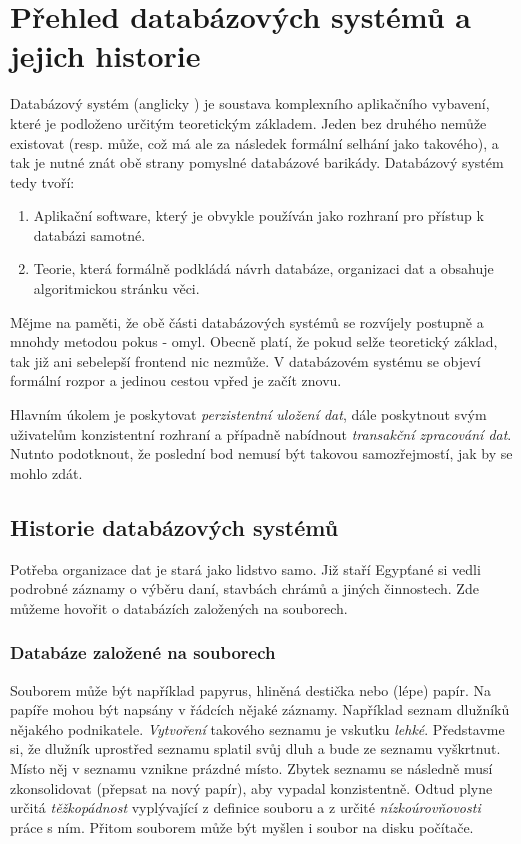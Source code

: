 \section{Přehled databázových systémů a jejich historie}

Databázový systém (anglicky ) je soustava komplexního aplikačního vybavení, které je podloženo určitým teoretickým základem. Jeden bez druhého nemůže existovat (resp. může, což má ale za následek formální selhání  jako takového), a tak je nutné znát obě strany pomyslné databázové barikády. Databázový systém tedy tvoří:
\begin{enumerate}
\item Aplikační software, který je obvykle používán jako rozhraní pro přístup k databázi samotné.
\item Teorie, která formálně podkládá návrh databáze, organizaci dat a obsahuje algoritmickou stránku věci.
\end{enumerate}

Mějme na paměti, že obě části databázových systémů se rozvíjely postupně a mnohdy metodou pokus - omyl. Obecně platí, že pokud selže teoretický základ, tak již ani sebelepší frontend nic nezmůže. V databázovém systému se objeví formální rozpor a jedinou cestou vpřed je začít znovu.

Hlavním úkolem  je poskytovat \textit{perzistentní uložení dat}, dále poskytnout svým uživatelům konzistentní rozhraní a případně nabídnout \textit{transa\-kční zpracování dat}. Nutnto podotknout, že poslední bod nemusí být takovou samozřejmostí, jak by se mohlo zdát.

\subsection{Historie databázových systémů}
Potřeba organizace dat je stará jako lidstvo samo. Již staří Egypťané si vedli podrobné záznamy o výběru daní, stavbách chrámů a jiných činnostech. Zde můžeme hovořit o databázích založených na souborech.

\subsubsection{Databáze založené na souborech}
Souborem může být například papyrus, hliněná destička nebo (lépe) papír. Na papíře mohou být napsány v řádcích nějaké záznamy. Například seznam dlužníků nějakého podnikatele. \textit{Vytvoření} takového seznamu je vskutku \textit{lehké}. Představme si, že dlužník uprostřed seznamu splatil svůj dluh a bude ze seznamu vyškrtnut. Místo něj v seznamu vznikne prázdné místo. Zbytek seznamu se následně musí zkonsolidovat (přepsat na nový papír), aby vypadal konzistentně. Odtud plyne určitá \textit{těžkopádnost} vyplývající z definice souboru a z určité \textit{nízkoúrovňovosti} práce s ním. Přitom souborem může být myšlen i soubor na disku počítače.

